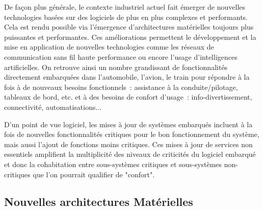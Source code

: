 \documentclass[french, a4paper, 11pt, twoside, pdftex]{StyleThese}
\begin{document}
		De façon plus générale, le contexte industriel actuel fait émerger de nouvelles technologies basées sur des logiciels de plus en plus complexes et performants. Cela est rendu possible via l'émergence d'architectures matérielles toujours plus puissantes et performantes. Ces améliorations permettent le développement et la mise en application de nouvelles technologies comme les réseaux de communication sans fil haute performance ou encore l'usage d'intelligences artificielles. On retrouve ainsi un nombre grandissant de fonctionnalités directement embarquées dans l'automobile, l'avion, le train pour répondre à la fois à de nouveaux besoins fonctionnels~: assistance à la conduite/pilotage, tableaux de bord, etc. et à des besoins de confort d'usage~: info-divertissement, connectivité, automatisations...
		
		D'un point de vue logiciel, les mises à jour de systèmes embarqués incluent à la fois de nouvelles fonctionnalités critiques pour le bon fonctionnement du système, mais aussi l'ajout de fonctions moins critiques. Ces mises à jour de services non essentiels amplifient  la multiplicité des niveaux de criticités du logiciel embarqué et donc la cohabitation entre sous-systèmes critiques et sous-systèmes non-critiques que l'on pourrait qualifier de "confort".
		
	\subsection{Nouvelles architectures Matérielles}
\end{document}
